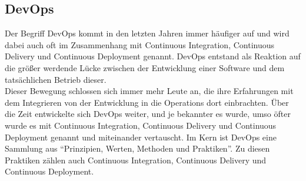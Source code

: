 \subsection{DevOps}\label{devops}
Der Begriff DevOps kommt in den letzten Jahren immer häufiger auf\autocite{Sauce.2018} und wird dabei auch oft im Zusammenhang mit Continuous Integration, Continuous Delivery und Continuous Deployment genannt. DevOps entstand als Reaktion auf die größer werdende Lücke zwischen der Entwicklung einer Software und dem tatsächlichen Betrieb dieser.\autocite[Vgl.][S.22]{Stahl.2018}\\ Dieser Bewegung schlossen sich immer mehr Leute an, die ihre Erfahrungen mit dem Integrieren von der Entwicklung in die Operations dort einbrachten. Über die Zeit entwickelte sich DevOps weiter, und je bekannter es wurde, umso öfter wurde es mit Continuous Integration, Continuous Delivery und Continuous Deployment genannt und miteinander vertauscht.\autocite[Vgl.][S.23]{Stahl.2018} Im Kern ist DevOps eine Sammlung aus \enquote{Prinzipien, Werten, Methoden und Praktiken}\autocite[S.23]{Stahl.2018}. Zu diesen Praktiken zählen auch Continuous Integration, Continuous Delivery und Continuous Deployment. 
